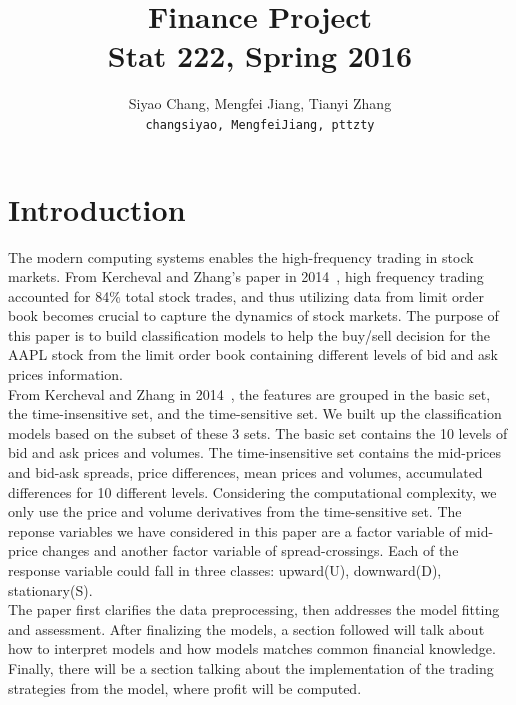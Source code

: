 \documentclass[11pt]{article}
\title{Finance Project\\
  Stat 222, Spring 2016}
\author{
  Siyao Chang, Mengfei Jiang, Tianyi Zhang\\
  \texttt{changsiyao, MengfeiJiang, pttzty}
}
\begin{document}
\maketitle



\section{Introduction}
The modern computing systems enables the high-frequency trading in stock markets. From Kercheval and Zhang's paper in 2014~\cite{financesvm}, high frequency trading accounted for 84\% total stock trades, and thus utilizing data from limit order book becomes crucial to capture the dynamics of stock markets. The purpose of this paper is to build classification models to help the buy/sell decision for the AAPL stock from the limit order book containing different levels of bid and ask prices information.\\
From Kercheval and Zhang in 2014~\cite{financesvm}, the features are grouped in the basic set, the time-insensitive set, and the time-sensitive set. We built up the classification models based on the subset of these 3 sets. The basic set contains the 10 levels of bid and ask prices and volumes. The time-insensitive set contains the mid-prices and bid-ask spreads, price differences, mean prices and volumes, accumulated differences for 10 different levels. Considering the computational complexity, we only use the price and volume derivatives from the time-sensitive set. The reponse variables we have considered in this paper are a factor variable of mid-price changes and another factor variable of spread-crossings. Each of the response variable could fall in three classes: upward(U), downward(D), stationary(S).\\
The paper first clarifies the data preprocessing, then addresses the model fitting and assessment. After finalizing the models, a section followed will talk about how to interpret models and how models matches common financial knowledge. Finally, there will be a section talking about the implementation of the trading strategies from the model, where profit will be computed.
\end{document}
